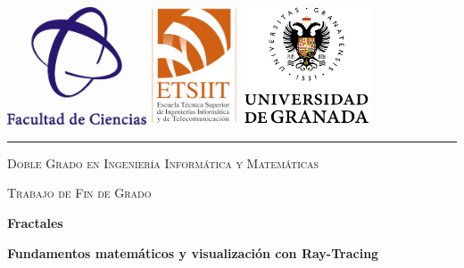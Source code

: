 \begin{titlepage}
	\includegraphics[height=35mm]{img/LogoFacultadCiencias.png}
	\includegraphics[height=35mm]{img/LogoETSIIT.png}
	\hfill
	\includegraphics[height=35mm]{img/LogoUGR.png}
	\hspace{1cm}

\vspace{0.5cm}
\hrule
\vspace{1cm}
{\Large\centering \textsc{Doble Grado en Ingeniería Informática y Matemáticas} \par}
{\Large\centering \textsc{Trabajo de Fin de Grado} \par}


	\vspace{1cm}
	{\Huge\centering \textbf{Fractales} \par}
	\vspace{0.5cm}
	{\LARGE\centering \textbf{Fundamentos matemáticos y visualización con Ray-Tracing} \par}


\end{titlepage}

